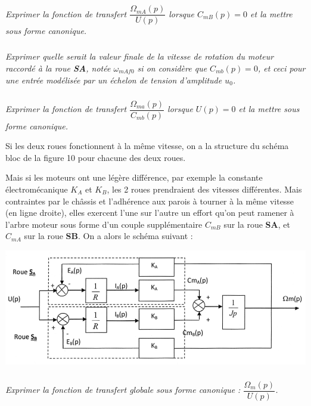 \documentclass[10pt,fleqn]{article} %
\begin{document}
\subparagraph{}
\textit{Exprimer la fonction de transfert $\dfrac{\Omega_{mA}(p)}{U(p)}$ lorsque $C_{mB}(p)=0$ et la mettre sous forme canonique.}
\ifprof
\begin{corrige}
\end{corrige}
\else
\fi


\subparagraph{}
\textit{Exprimer quelle serait la valeur finale de la vitesse de rotation du moteur raccordé à la roue \textbf{SA}, notée $\omega_{mAf0}$ si on considère que $C_{mb}(p)=0$, et ceci pour une entrée modélisée par un échelon de tension d’amplitude $u_0$.}
\ifprof
\begin{corrige}
\end{corrige}
\else
\fi


\subparagraph{}
\textit{Exprimer la fonction de transfert $\dfrac{\Omega_{ma}(p)}{C_{mb}(p)}$ lorsque $U(p)=0$ et la mettre sous forme canonique.}
\ifprof
\begin{corrige}
\end{corrige}
\else
\fi

Si les deux roues fonctionnent à la même vitesse, on a la structure du schéma bloc de la figure 10 pour chacune des deux roues.

Mais si les moteurs ont une légère différence, par exemple la constante électromécanique $K_A$ et $K_B$, les 2 roues prendraient des vitesses différentes. Mais contraintes par le châssis et l’adhérence aux parois à tourner à la même vitesse (en ligne droite), elles exercent l’une sur l’autre un effort qu’on peut ramener à l’arbre moteur sous forme d’un couple supplémentaire $C_{mB}$ sur la roue \textbf{SA}, et $C_{mA}$ sur la roue \textbf{SB}. On a alors le schéma suivant :
\begin{center}
	\includegraphics[width=\linewidth]{images/fig_11}
\end{center}

\subparagraph{}
\textit{Exprimer la fonction de transfert globale sous forme canonique : $\dfrac{\Omega_m(p)}{U(p)}$.}
\ifprof
\begin{corrige}
\end{corrige}
\else
\fi
\end{document}
